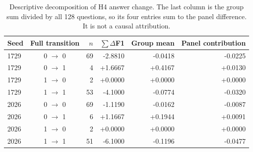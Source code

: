 \begin{table}[t]
\centering\small
\caption{Descriptive decomposition of H4 answer change. The last column is the group sum divided by all 128 questions, so its four entries sum to the panel difference. It is not a causal attribution.}\label{tab:decomp}
\begin{tabular}{lcrrrr}\toprule
Seed & Full transition & $n$ & $\sum\Delta$F1 & Group mean & Panel contribution \\
\midrule
1729 & 0 $\to$ 0 & 69 & -2.8810 & -0.0418 & -0.0225 \\
1729 & 0 $\to$ 1 & 4 & +1.6667 & +0.4167 & +0.0130 \\
1729 & 1 $\to$ 0 & 2 & +0.0000 & +0.0000 & +0.0000 \\
1729 & 1 $\to$ 1 & 53 & -4.1000 & -0.0774 & -0.0320 \\
2026 & 0 $\to$ 0 & 69 & -1.1190 & -0.0162 & -0.0087 \\
2026 & 0 $\to$ 1 & 6 & +1.1667 & +0.1944 & +0.0091 \\
2026 & 1 $\to$ 0 & 2 & +0.0000 & +0.0000 & +0.0000 \\
2026 & 1 $\to$ 1 & 51 & -6.1000 & -0.1196 & -0.0477 \\
\bottomrule\end{tabular}
\end{table}
